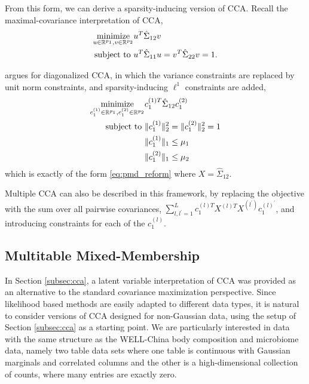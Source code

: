 \documentclass{article}
\begin{document}
From this form, we can derive a sparsity-inducing version of
CCA. Recall the maximal-covariance interpretation of CCA,
\begin{align*}
  \mathop\mathrm{minimize}_{u \in \mathbb{R}^{p_{1}}, v \in \mathbb{R}^{p_{2}}} &u^{T}\hat{\Sigma}_{12}v \\
  \text{subject to } &u^{T}\hat{\Sigma}_{11} u = v^{ T}\hat{\Sigma}_{22}v = 1.
\end{align*}

\citep{witten2009penalized} argues for diagonalized CCA, in which the variance
constraints are replaced by unit norm constraints, and sparsity-inducing
$\ell^{1}$ constraints are added,
\begin{align*}
  \mathop\mathrm{minimize}_{c_{1}^{(1)} \in \mathbb{R}^{p_{1}}, c_{1}^{(2)} \in
    \mathbb{R}^{p_{2}}} & c_{1}^{(1) T}\hat{\Sigma}_{12}
  c_{1}^{(2)} \\
  \text{subject to } &\|c_{1}^{(1)}\|_{2}^{2} = \|c_{1}^{(2)}\|_{2}^{2} = 1 \\
  &\|c_{1}^{(1)}\|_{1} \leq \mu_{1} \\
  &\|c_{1}^{(2)}\|_{1} \leq \mu_{2}
\end{align*}
which is exactly of the form \ref{eq:pmd_reform} where $X =
\hat{\Sigma}_{12}$.

Multiple CCA can also be described in this framework, by replacing the objective
with the sum over all pairwise covariances, $\sum_{l, l^{\prime} = 1}^{L}
c_{1}^{(l) T}X^{(l) T}X^{(l^{\prime})}c_{1}^{(l)^{\prime}}$, and introducing
constraints for each of the $c_{1}^{(l)}$.

\subsection{Multitable Mixed-Membership}
\label{subsec:multitable_mixed_membership}

In Section \ref{subsec:cca}, a latent variable interpretation of CCA was
provided as an alternative to the standard covariance maximization perspective.
Since likelihood based methods are easily adapted to different data types, it is
natural to consider versions of CCA designed for non-Gaussian data, using the
setup of Section \ref{subsec:cca} as a starting point. We are particularly
interested in data with the same structure as the WELL-China body composition
and microbiome data, namely two table data sets where one table is continuous
with Gaussian marginals and correlated columns and the other is a
high-dimensional collection of counts, where many entries are exactly zero.
\end{document}

